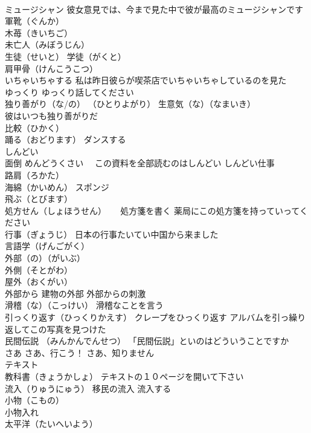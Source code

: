 \documentclass[8pt]{extreport}
\begin{document}
\begin{CJK}{UTF8}{min}
\\	ミュージシャン 彼女意見では、今まで見た中で彼が最高のミュージシャンです
\\	軍靴（ぐんか） 
\\	木苺（きいちご）
\\	未亡人（みぼうじん）
\\	生徒（せいと） 学徒（がくと）
\\	肩甲骨（けんこうこつ）
\\	いちゃいちゃする 私は昨日彼らが喫茶店でいちゃいちゃしているのを見た
\\	ゆっくり ゆっくり話してください
\\	独り善がり（な/の） （ひとりよがり） 生意気（な）（なまいき）
\\	彼はいつも独り善がりだ
\\	比較（ひかく）
\\	踊る（おどります） ダンスする
\\	しんどい 
\\	面倒 めんどうくさい　 この資料を全部読むのはしんどい しんどい仕事
\\	路肩（ろかた）
\\	海綿（かいめん） スポンジ
\\	飛ぶ（とびます）
\\	処方せん（しょほうせん） 　 処方箋を書く 薬局にこの処方箋を持っていってください
\\	行事（ぎょうじ） 日本の行事たいてい中国から来ました
\\	言語学（げんごがく）
\\	外部（の）（がいぶ）
\\	外側（そとがわ）
\\	屋外（おくがい）
\\	外部から 建物の外部 外部からの刺激
\\	滑稽（な）（こっけい） 滑稽なことを言う
\\	引っくり返す（ひっくりかえす） クレープをひっくり返す アルバムを引っ繰り返してこの写真を見つけた
\\	民間伝説 （みんかんでんせつ） 「民間伝説」といのはどういうことですか
\\	さあ さあ、行こう！ さあ、知りません
\\	テキスト 
\\	教科書（きょうかしょ） テキストの１０ページを開いて下さい
\\	流入（りゅうにゅう） 移民の流入 流入する
\\	小物（こもの） 
\\	小物入れ
\\	太平洋（たいへいよう）

\end{CJK}
\end{document}
